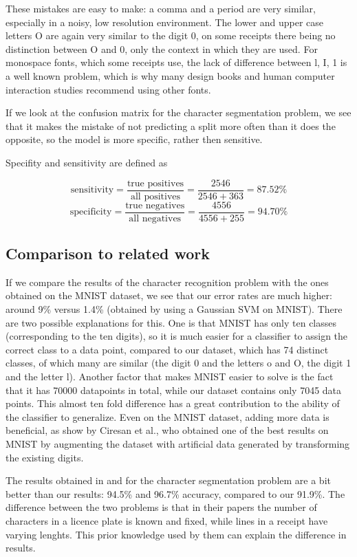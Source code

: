 These mistakes are easy to make: a comma and a period are very similar, especially in a noisy, low resolution environment. The lower and upper case letters O are again very similar to the digit 0, on some receipts there being no distinction between O and 0, only the context in which they are used. For monospace fonts, which some receipts use, the lack of difference between l, I, 1 is a well known problem, which is why many design books and human computer interaction studies recommend using other fonts\cite{chaparro2006examining}. 

If we look at the confusion matrix for the character segmentation problem, we see that it makes the mistake of not predicting a split more often than it does the opposite, so the model is more specific, rather then sensitive. 

Specifity and sensitivity are defined as\cite{Fawcett_2006}

\[
    \text{sensitivity} = \frac{\text{true positives}}{\text{all positives}} = \frac{2546}{2546+363} = 87.52 \%
\]
\[
    \text{specificity} = \frac{\text{true negatives}}{\text{all negatives}} = \frac{4556}{4556+255} =  94.70 \%
\]

\subsection{Comparison to related work}
If we compare the results of the character recognition problem with the ones obtained on the MNIST dataset\cite{lecun1998mnist}, we see that our error rates are much higher: around 9\% versus 1.4\% (obtained by using a Gaussian SVM on MNIST). There are two possible explanations for this. One is that MNIST has only ten classes (corresponding to the ten digits), so it is much easier for a classifier to assign the correct class to a data point, compared to our dataset, which has 74 distinct classes, of which many are similar (the digit 0 and the letters o and O, the digit 1 and the letter l). Another factor that makes MNIST easier to solve is the fact that it has 70000 datapoints in total, while our dataset contains only 7045 data points. This almost ten fold difference has a great contribution to the ability of the classifier to generalize. Even on the MNIST dataset, adding more data is beneficial, as show by Ciresan et al.\cite{Cire_an_2010}, who obtained one of the best results on MNIST by augmenting the dataset with artificial data generated by transforming the existing digits. 

The results obtained in \cite{kahraman2003license} and \cite{Franc_2005} for the character segmentation problem are a bit better than our results: 94.5\% and 96.7\% accuracy, compared to our 91.9\%. The difference between the two problems is that in their papers the number of characters in a licence plate is known and fixed, while lines in a receipt have varying lenghts. This prior knowledge used by them can explain the difference in results. 

